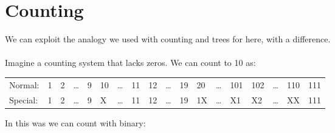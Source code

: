 \documentclass{report}
\begin{document}
    \section*{Counting}
        We can exploit the analogy we used with counting and trees for  here, with a difference.
        \\
        \\ Imagine a counting system that lacks zeros. We can count to 10 as:
        \begin{center}
            \begin{tabular}{l l l l l l l l l l l l l l l l l l}
                Normal:  & 1 & 2 & \dots & 9 & 10 & \dots & 11 & 12 & \dots & 19 & 20 & \dots & 101 & 102 & \dots & 110 & 111 \\
                Special: & 1 & 2 & \dots & 9 & X  & \dots & 11 & 12 & \dots & 19 & 1X & \dots & X1  & X2  & \dots & XX  & 111 \\
            \end{tabular}
        \end{center}
        In this was we can count with binary:
        \\
        \\\unfinished
\end{document}

